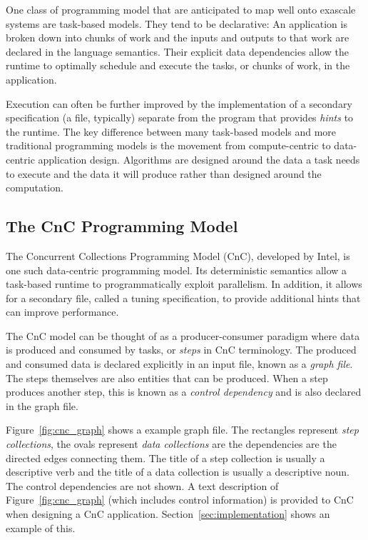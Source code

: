 One class of programming model that are anticipated to map well onto exascale 
systems are task-based models. They tend to be declarative: An application is
broken down into chunks of work and the inputs and outputs to that work are 
declared in the language semantics. Their explicit data dependencies allow the 
runtime to optimally schedule and execute the tasks, or chunks of work, in the 
application.

Execution can often be further improved by the implementation of a
secondary specification (a file, typically) separate from the program
that provides \emph{hints} to the runtime. The key difference between many
task-based models and more traditional programming models is the
movement from compute-centric to data-centric application design.
Algorithms are designed around the data a task needs to execute and
the data it will produce rather than designed around the computation.

\subsection{The CnC Programming Model}
\label{sec:cnc}

The Concurrent Collections Programming Model (CnC), developed by
Intel, is one such data-centric programming model. Its deterministic
semantics allow a task-based runtime to programmatically exploit
parallelism. In addition, it allows for a secondary file, called a
tuning specification, to provide additional hints that can improve performance.

The CnC model can be thought of as a producer-consumer paradigm where
data is produced and consumed by tasks, or \emph{steps} in CnC
terminology. The produced and consumed data is declared explicitly in
an input file, known as a \emph{graph file}. The steps themselves are
also entities that can be produced. When a step produces another step,
this is known as a \emph{control dependency} and is also declared in the
graph file.

Figure~\ref{fig:cnc_graph} shows a example graph file. The rectangles represent
\emph{step collections}, the ovals represent \emph{data collections} are the
dependencies are the directed edges connecting them. The title of a step
collection is usually a descriptive verb and the title of a data
collection is usually a descriptive noun. The control dependencies are
not shown. A text description of Figure~\ref{fig:cnc_graph} (which
includes control information) is provided to CnC when designing a CnC
application.  Section~\ref{sec:implementation} shows an example of this.

